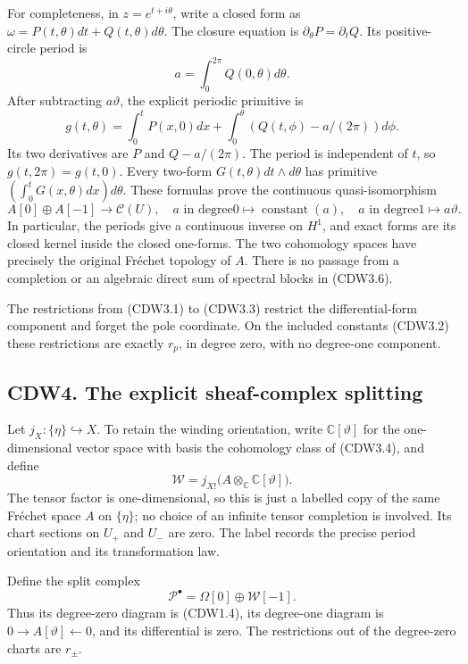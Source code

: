 For completeness, in \(z=e^{t+i\theta}\), write a closed form as
\(\omega=P(t,\theta)dt+Q(t,\theta)d\theta\). The closure equation is
\(\partial_\theta P=\partial_tQ\). Its positive-circle period is \[
a=\int_0^{2\pi}Q(0,\theta)d\theta.
\] After subtracting \(a\vartheta\), the explicit periodic primitive is
\[
g(t,\theta)=\int_0^tP(x,0)dx+
\int_0^\theta\left(Q(t,\phi)-a/(2\pi)\right)d\phi.
\tag{CDW3.5}
\] Its two derivatives are \(P\) and \(Q-a/(2\pi)\). The period is
independent of \(t\), so \(g(t,2\pi)=g(t,0)\). Every two-form
\(G(t,\theta)dt\wedge d\theta\) has primitive
\((\int_0^tG(x,\theta)dx)d\theta\). These formulas prove the continuous
quasi-isomorphism \[
A[0]\oplus A[-1]\longrightarrow\mathscr C(U),
\quad a\text{ in degree0}\mapsto\operatorname{constant}(a),\quad
a\text{ in degree1}\mapsto a\vartheta.
\tag{CDW3.6}
\] In particular, the periods give a continuous inverse on \(H^1\), and
exact forms are its closed kernel inside the closed one-forms. The two
cohomology spaces have precisely the original Fréchet topology of \(A\).
There is no passage from a completion or an algebraic direct sum of
spectral blocks in (CDW3.6).

The restrictions from (CDW3.1) to (CDW3.3) restrict the
differential-form component and forget the pole coordinate. On the
included constants (CDW3.2) these restrictions are exactly \(r_p\), in
degree zero, with no degree-one component.

\subsection{CDW4. The explicit sheaf-complex
splitting}\label{cdw4.-the-explicit-sheaf-complex-splitting}

Let \(j_X:\{\eta\}\hookrightarrow X\). To retain the winding
orientation, write \(\mathbb C[\vartheta]\) for the one-dimensional
vector space with basis the cohomology class of (CDW3.4), and define \[
\mathscr W=j_{X!}\bigl(A\otimes_{\mathbb C}\mathbb C[\vartheta]\bigr).
\tag{CDW4.1}
\] The tensor factor is one-dimensional, so this is just a labelled copy
of the same Fréchet space \(A\) on \(\{\eta\}\); no choice of an
infinite tensor completion is involved. Its chart sections on \(U_+\)
and \(U_-\) are zero. The label records the precise period orientation
and its transformation law.

Define the split complex \[
\mathscr P^\bullet=\Omega[0]\oplus\mathscr W[-1].
\tag{CDW4.2}
\] Thus its degree-zero diagram is (CDW1.4), its degree-one diagram is
\(0\to A[\vartheta]\leftarrow0\), and its differential is zero. The
restrictions out of the degree-zero charts are \(r_\pm\).

